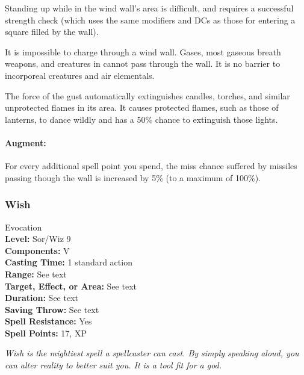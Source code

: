 Standing up while in the wind wall's area is difficult, and requires a successful strength check (which uses the same modifiers
and DCs as those for entering a square filled by the wall).

It is impossible to charge through a wind wall.
Gases, most gaseous breath weapons, and creatures in  cannot pass through the wall.
It is no barrier to incorporeal creatures and air elementals.

The force of the gust automatically extinguishes candles, torches, and similar unprotected flames in its area. 
It causes protected flames, such as those of lanterns, to dance wildly and has a 50\% chance to extinguish those lights.

\paragraph{Augment:} For every additional spell point you spend, the miss chance suffered by missiles passing though the wall
is increased by 5\% (to a maximum of 100\%).
\subsubsection{Wish}
\label{Spell:Wish}
Evocation
\\ \textbf{Level:} Sor/Wiz 9
\\ \textbf{Components:} V
\\ \textbf{Casting Time:} 1 standard action
\\ \textbf{Range:} See text
\\ \textbf{Target, Effect, or Area:} See text
\\ \textbf{Duration:} See text
\\ \textbf{Saving Throw:} See text
\\ \textbf{Spell Resistance:} Yes
\\ \textbf{Spell Points:} 17, XP

\emph{Wish is the mightiest spell a spellcaster can cast. By simply speaking aloud, you can alter reality to better suit you.
It is a tool fit for a god.}

